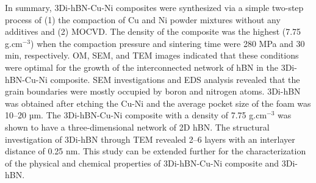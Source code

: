 In summary, 3Di-hBN-Cu-Ni composites were synthesized via a simple two-step process of (1) the compaction of Cu and Ni powder mixtures without any additives and (2) MOCVD. The density of the composite was the highest (7.75 g.c$\text{m}^{-3}$) when the compaction pressure and sintering time were 280 MPa and 30 min, respectively. OM, SEM, and TEM images indicated that these conditions were optimal for the growth of the interconnected network of hBN in the 3Di-hBN-Cu-Ni composite. SEM investigations and EDS analysis revealed that the grain boundaries were mostly occupied by boron and nitrogen atoms. 3Di-hBN was obtained after etching the Cu-Ni and the average pocket size of the foam was 10–20 µm. The 3Di-hBN-Cu-Ni composite with a density of 7.75 g.c$\text{m}^{-3}$ was shown to have a three-dimensional network of 2D hBN. The structural investigation of 3Di-hBN through TEM revealed 2–6 layers with an interlayer distance of 0.25 nm. This study can be extended further for the characterization of the physical and chemical properties of 3Di-hBN-Cu-Ni composite and 3Di-hBN.
